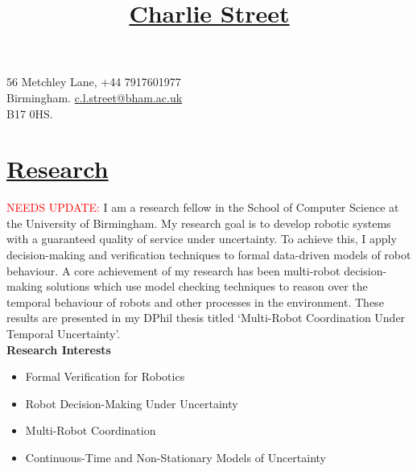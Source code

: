 \documentclass[11pt]{article}
\title{\vspace{-70pt}\Huge\underline{Charlie Street}}
\date{}
\begin{document}
\maketitle
\vspace*{-60pt}

\begin{flushleft}
\noindent
\large 56 Metchley Lane,
\hfill 
\large +44 7917601977 \\
\large Birmingham. 
\hfill
\large
\large \href{mailto:c.l.street@bham.ac.uk}{\url{c.l.street@bham.ac.uk}} \\
\large B17 0HS.
\\
\end{flushleft}
	
\section*{\uline{Research}}	
\textcolor{red}{NEEDS UPDATE:}
I am a research fellow in the School of Computer Science at the University of Birmingham.
%
My research goal is to develop robotic systems with a guaranteed quality of service under uncertainty.
%
To achieve this, I apply decision-making and verification techniques to formal data-driven models of robot behaviour.
%
A core achievement of my research has been multi-robot decision-making solutions which use model checking techniques to reason over the temporal behaviour of robots and other processes in the environment.
%
These results are presented in my DPhil thesis titled `Multi-Robot Coordination Under Temporal Uncertainty'.\\

\noindent \textbf{Research Interests}
\begin{itemize}
    \item Formal Verification for Robotics 
    \item Robot Decision-Making Under Uncertainty
    \item Multi-Robot Coordination
    \item Continuous-Time and Non-Stationary Models of Uncertainty
\end{itemize}
\end{document}
